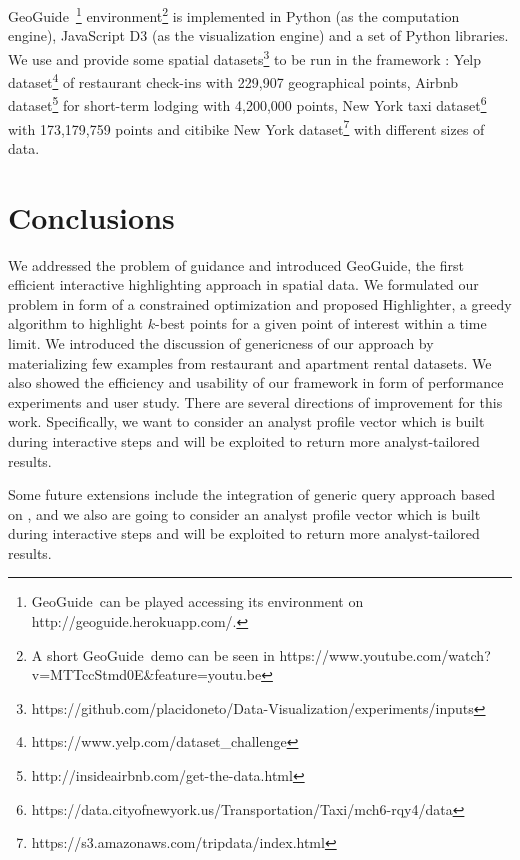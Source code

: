 \documentclass[conference,compsoc]{IEEEtran}
\newcommand{\framework}{{\sc GeoGuide}}
\begin{document}
\vspace{5pt}
\framework\ \footnote{\framework\ can be played accessing its environment on http://geoguide.herokuapp.com/.} environment\footnote{A short \framework\ demo can be seen in https://www.youtube.com/watch?v=MTTccStmd0E\&feature=youtu.be} is implemented in Python (as the computation engine), JavaScript D3 (as the visualization engine) and a set of Python libraries. We use and provide some spatial datasets\footnote{https://github.com/placidoneto/Data-Visualization/experiments/inputs} to be run in the framework  : Yelp dataset\footnote{https://www.yelp.com/dataset\_challenge} of restaurant check-ins with 229,907 geographical points, Airbnb dataset\footnote{http://insideairbnb.com/get-the-data.html} for short-term lodging with 4,200,000 points, New York taxi dataset\footnote{https://data.cityofnewyork.us/Transportation/Taxi/mch6-rqy4/data} with 173,179,759 points and citibike New York dataset\footnote{https://s3.amazonaws.com/tripdata/index.html} with different sizes of data. 

\section{Conclusions}
\label{sec:conclusions}

We addressed the problem of guidance and introduced \framework, the first efficient interactive highlighting approach in spatial data. We formulated our problem in form of a constrained optimization and proposed {\sc Highlighter}, a greedy algorithm to highlight $k$-best points for a given point of interest within a time limit. We introduced the discussion of genericness of our approach by materializing few examples from restaurant and apartment rental datasets. We also showed the efficiency and usability of our framework in form of performance experiments and user study. There are several directions of improvement for this work. Specifically, we want to consider an analyst profile vector which is built during interactive steps and will be exploited to return more analyst-tailored results.

Some future extensions include the integration of generic query approach based on \cite{VartakRMPP15}, and we also are going to consider an analyst profile vector which is built during interactive steps and will be exploited to return more analyst-tailored results.






\end{document}
